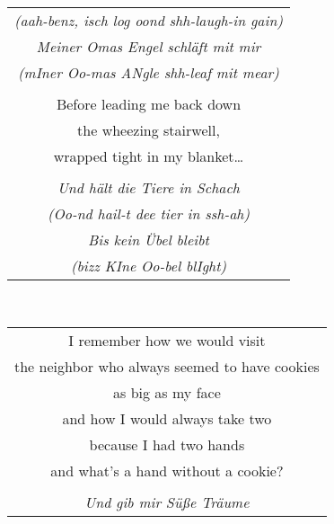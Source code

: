 \documentclass{article}
\begin{document}
\begin{center}
\begin{tabular}{c}
{\scriptsize\textit{(aah-benz, isch log oond shh-laugh-in gain)}} \\
\textit{Meiner Omas Engel schl{\"a}ft mit mir} \\
{\scriptsize\textit{(mIner Oo-mas ANgle shh-leaf mit mear)}} \\
\\
Before leading me back down \\
the wheezing stairwell, \\
wrapped tight in my blanket\ldots{} \\
\\
\textit{Und h{\"a}lt die Tiere in Schach} \\
{\scriptsize\textit{(Oo-nd hail-t dee tier in ssh-ah)}} \\
\textit{Bis kein {\"U}bel bleibt} \\
{\scriptsize\textit{(bizz KIne Oo-bel blIght)}} \\
\end{tabular}\\
\begin{tabular}{c}
\\
I remember how we would visit \\
the neighbor who always seemed to have cookies \\
as big as my face \\
and how I would always take two \\
because I had two hands \\
and what's a hand without a cookie? \\
\\
\textit{Und gib mir S{\"u}{\ss}e Tr{\"a}ume} \\

\end{tabular}
\end{center}
\end{document}

